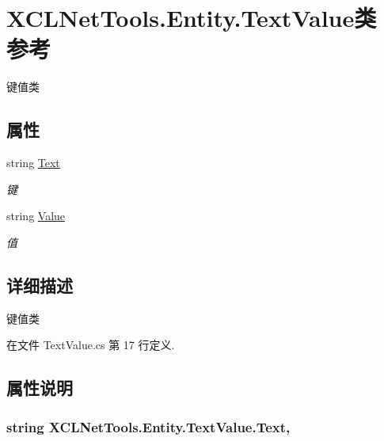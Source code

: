 \hypertarget{class_x_c_l_net_tools_1_1_entity_1_1_text_value}{}\section{X\+C\+L\+Net\+Tools.\+Entity.\+Text\+Value类 参考}
\label{class_x_c_l_net_tools_1_1_entity_1_1_text_value}


键值类  


\subsection*{属性}
\begin{DoxyCompactItemize}
\item 
string \hyperlink{class_x_c_l_net_tools_1_1_entity_1_1_text_value_a56860ac04aa98fbb3e41e5b451d16c4a}{Text}
\begin{DoxyCompactList}\small\item\em 键 \end{DoxyCompactList}\item 
string \hyperlink{class_x_c_l_net_tools_1_1_entity_1_1_text_value_a8a193486b942adc898433bd29db3eff7}{Value}
\begin{DoxyCompactList}\small\item\em 值 \end{DoxyCompactList}\end{DoxyCompactItemize}


\subsection{详细描述}
键值类 



在文件 Text\+Value.\+cs 第 17 行定义.



\subsection{属性说明}
\subsubsection[{\texorpdfstring{Text}{Text}}]{\setlength{\rightskip}{0pt plus 5cm}string X\+C\+L\+Net\+Tools.\+Entity.\+Text\+Value.\+Text\hspace{0.3cm}{\ttfamily [get]}, {\ttfamily [set]}}\hypertarget{class_x_c_l_net_tools_1_1_entity_1_1_text_value_a56860ac04aa98fbb3e41e5b451d16c4a}{}\label{class_x_c_l_net_tools_1_1_entity_1_1_text_value_a56860ac04aa98fbb3e41e5b451d16c4a}


